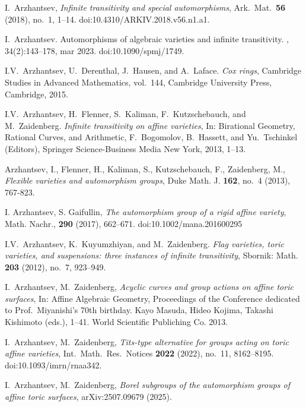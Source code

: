 I.~Arzhantsev,
\emph{Infinite transitivity and special automorphisms},
Ark.\ Mat.\ \textbf{56} (2018), no.~1, 1--14.
doi:10.4310/ARKIV.2018.v56.n1.a1.

I.~Arzhantsev.
\newblock Automorphisms of algebraic varieties and infinite transitivity.
, 34(2):143--178, mar 2023.
\newblock doi:10.1090/spmj/1749.

I.V.~Arzhantsev, U.~Derenthal, J.~Hausen, and A.~Laface.
\emph{Cox rings}, Cambridge Studies in Advanced Mathematics, vol.~144,
Cambridge University Press, Cambridge, 2015.

I.V.~Arzhantsev, H.~Flenner, S.~Kaliman, F.~Kutzschebauch, and M.~Zaidenberg.
\emph{Infinite transitivity on affine varieties}, In: Birational Geometry, Rational
Curves, and Arithmetic, F.~Bogomolov, B.~Hassett, and
Yu.~Tschinkel (Editors), Springer Science-Business Media New York, 2013, 1--13.

Arzhantsev, I., Flenner, H., Kaliman, S., Kutzschebauch, F., Zaidenberg, M., \emph{Flexible varieties and automorphism groups}, Duke Math. J. \textbf{162}, no.~4 (2013), 767-823.

I. Arzhantsev, S. Gaifullin, \emph{The automorphism group of a rigid affine variety}, Math. Nachr., \textbf{290} (2017), 662--671. doi:10.1002/mana.201600295

I.V.~Arzhantsev, K.~Kuyumzhiyan, and M.~Zaidenberg.
\emph{Flag varieties, toric varieties, and suspensions:
three instances of infinite transitivity}, Sbornik: Math. \textbf{203} (2012), no.~7, 923--949.

I.~Arzhantsev, M.~Zaidenberg, \emph{Acyclic curves
and group actions on affine toric surfaces}, In: Affine Algebraic
Geometry, Proceedings of the Conference dedicated to Prof.\
Miyanishi's 70th birthday. Kayo Masuda, Hideo Kojima, Takashi
Kishimoto (eds.), 1--41. World Scientific Publiching Co. 2013.

I.~Arzhantsev, M.~Zaidenberg,
\emph{Tits-type alternative for groups acting on toric affine varieties},
Int.\ Math.\ Res.\ Notices \textbf{2022} (2022), no.~11, 8162--8195.
doi:10.1093/imrn/rnaa342.

I.~Arzhantsev, M.~Zaidenberg,
\emph{Borel subgroups of the automorphism groups of affine toric surfaces},
arXiv:2507.09679 (2025).

